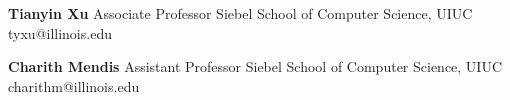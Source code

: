 \documentclass[11pt]{article}
\begin{document}
\begin{minipage}[t]{0.5\textwidth}
  \vspace{1.5em}
  \textbf{Tianyin Xu} \newline{}
  Associate Professor \newline{}
  Siebel School of Computer Science, UIUC \newline{}
  tyxu@illinois.edu
\end{minipage}
\begin{minipage}[t]{0.5\textwidth}
  \vspace{1.5em}
  \textbf{Charith Mendis} \newline{}
  Assistant Professor \newline{}
  Siebel School of Computer Science, UIUC \newline{}
  charithm@illinois.edu
\end{minipage}
\end{document}
